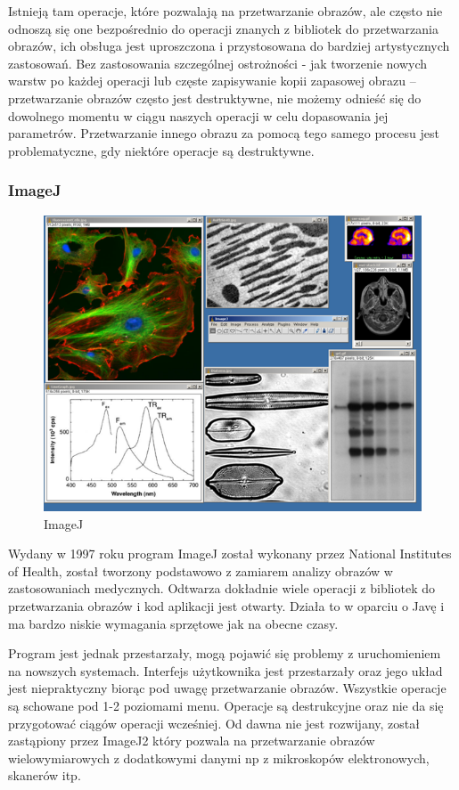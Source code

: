 Istnieją tam operacje, które pozwalają na przetwarzanie obrazów, ale często nie odnoszą się one bezpośrednio do operacji znanych z bibliotek do przetwarzania obrazów, ich obsługa jest uproszczona i przystosowana do bardziej artystycznych zastosowań. Bez zastosowania szczególnej ostrożności - jak tworzenie nowych warstw po każdej operacji lub częste zapisywanie kopii zapasowej obrazu – przetwarzanie obrazów często jest destruktywne, nie możemy odnieść się do dowolnego momentu w ciągu naszych operacji w celu dopasowania jej parametrów. Przetwarzanie innego obrazu za pomocą tego samego procesu jest problematyczne, gdy niektóre operacje są destruktywne.

\subsubsection{ImageJ}
\begin{figure}[H]
    \centering
    \includegraphics[width=0.8\linewidth]{./images/Picture3.png}
    \caption{ImageJ}
    \label{fig:imagej}
\end{figure}
Wydany w 1997 roku program ImageJ został wykonany przez National Institutes of Health, został tworzony podstawowo z zamiarem analizy obrazów w zastosowaniach medycznych. Odtwarza dokładnie wiele operacji z bibliotek do przetwarzania obrazów i kod aplikacji jest otwarty. Działa to w oparciu o Javę i ma bardzo niskie wymagania sprzętowe jak na obecne czasy.

Program jest jednak przestarzały, mogą pojawić się problemy z uruchomieniem na nowszych systemach. Interfejs użytkownika jest przestarzały oraz jego układ jest niepraktyczny biorąc pod uwagę przetwarzanie obrazów. Wszystkie operacje są schowane pod 1-2 poziomami menu. Operacje są destrukcyjne oraz nie da się przygotować ciągów operacji wcześniej. Od dawna nie jest rozwijany, został zastąpiony przez ImageJ2 który pozwala na przetwarzanie obrazów wielowymiarowych z dodatkowymi danymi np z mikroskopów elektronowych, skanerów itp.

